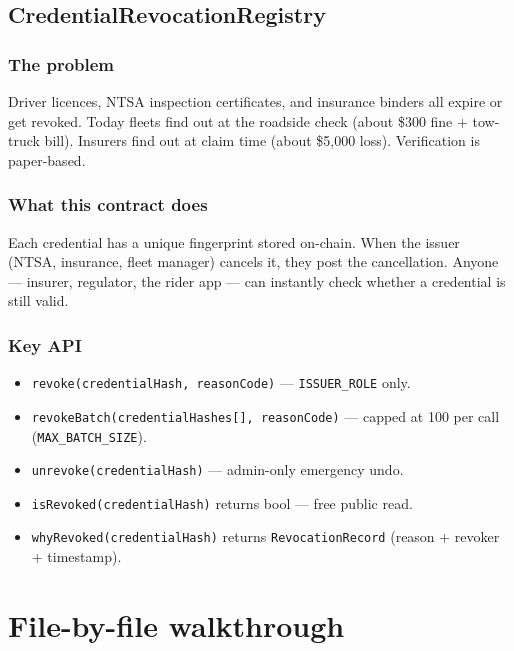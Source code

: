 \documentclass[11pt,a4paper]{article}
\begin{document}
\subsection{CredentialRevocationRegistry}

\subsubsection{The problem}
Driver licences, NTSA inspection certificates, and insurance binders all expire or get revoked. Today fleets find out at the roadside check (about \$300 fine + tow-truck bill). Insurers find out at claim time (about \$5,000 loss). Verification is paper-based.

\subsubsection{What this contract does}
Each credential has a unique fingerprint stored on-chain. When the issuer (NTSA, insurance, fleet manager) cancels it, they post the cancellation. Anyone --- insurer, regulator, the rider app --- can instantly check whether a credential is still valid.

\subsubsection{Key API}
\begin{itemize}[leftmargin=*, nosep]
  \item \texttt{revoke(credentialHash, reasonCode)} --- \texttt{ISSUER\_ROLE} only.
  \item \texttt{revokeBatch(credentialHashes[], reasonCode)} --- capped at 100 per call (\texttt{MAX\_BATCH\_SIZE}).
  \item \texttt{unrevoke(credentialHash)} --- admin-only emergency undo.
  \item \texttt{isRevoked(credentialHash)} returns bool --- free public read.
  \item \texttt{whyRevoked(credentialHash)} returns \texttt{RevocationRecord} (reason + revoker + timestamp).
\end{itemize}

\newpage
\section{File-by-file walkthrough}
\end{document}

